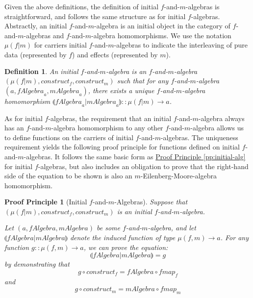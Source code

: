 \documentclass{jfp1}
\newcommand{\eFold}[2]{\llparenthesis #1|#2 \rrparenthesis}
\newtheorem{definition}{Definition}
\newtheorem{proofprinciple}{Proof Principle}
\newcommand{\proofprinref}[1]{\hyperref[#1]{Proof Principle \ref*{#1}}}
\begin{document}
Given the above definitions, the definition of initial
$f$-and-$m$-algebras is straightforward, and follows the same
structure as for initial $f$-algebras. Abstractly, an initial
$f$-and-$m$-algebra is an initial object in the category of
$f$-and-$m$-algebras and $f$-and-$m$-algebra homomorphisms. We use the
notation $\mu(f|m)$ for carriers initial $f$-and-$m$-algebras to
indicate the interleaving of pure data (represented by $f$) and
effects (represented by $m$).

\begin{definition}
  An \emph{initial $f$-and-$m$-algebra} is an $f$-and-$m$-algebra
  $(\mu(f|m), \mathit{construct}_f, \mathit{construct}_m)$ such that
  for any $f$-and-$m$-algebra $(a, \mathit{fAlgebra}_a,
  \mathit{mAlgebra}_a)$, there exists a unique $f$-and-$m$-algebra
  homomorphism $\eFold{\mathit{fAlgebra}_a}{\mathit{mAlgebra}_a} ::
  \mu(f|m) \to a$.
\end{definition}

As for initial $f$-algebras, the requirement that an initial
$f$-and-$m$-algebra always has an $f$-and-$m$-algebra homomorphism to
any other $f$-and-$m$-algebra allows us to define functions on the
carriers of initial $f$-and-$m$-algebras. The uniqueness requirement
yields the following proof principle for functions defined on initial
$f$-and-$m$-algebras. It follows the same basic form as
\proofprinref{pp:initial-alg} for initial $f$-algebras, but also
includes an obligation to prove that the right-hand side of the
equation to be shown is also an $m$-Eilenberg-Moore-algebra
homomorphism.

\begin{proofprinciple}[Initial $f$-and-$m$-Algebras]
  \label{pp:initial-f-m-alg}
  Suppose that $(\mu(f|m), \mathit{construct}_f, \mathit{construct}_m)$ is an
  initial $f$-and-$m$-algebra. 

  Let $(a, \mathit{fAlgebra}, \mathit{mAlgebra})$ be some
  $f$-and-$m$-algebra, and let
  $\eFold{\mathit{fAlgebra}}{\mathit{mAlgebra}}$ denote the induced
  function of type $\mu(f,m) \to a$. For any function $g :: \mu(f,m)
  \to a$, we can prove the equation:
  \begin{displaymath}
    \eFold{\mathit{fAlgebra}}{\mathit{mAlgebra}} = g
  \end{displaymath}
  by demonstrating that
  \begin{equation}\label{eq:fm-falg}
    g \circ \mathit{construct}_f = \mathit{fAlgebra} \circ \mathit{fmap}_f
  \end{equation}
  and
  \begin{equation}\label{eq:fm-malg}
    g \circ \mathit{construct}_m = \mathit{mAlgebra} \circ \mathit{fmap}_m
  \end{equation}
\end{proofprinciple}
\end{document}
